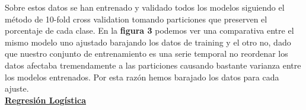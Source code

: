 \documentclass{article}
\begin{document}
Sobre estos datos se han entrenado y validado todos los modelos siguiendo el método de 10-fold cross validation tomando particiones que preserven el porcentaje de cada clase. En la \textbf{figura 3} podemos ver una comparativa entre el mismo modelo uno ajustado barajando los datos de training y el otro no, dado que nuestro conjunto de entrenamiento es una serie temporal no reordenar los datos afectaba tremendamente a las particiones causando bastante varianza entre los modelos entrenados. Por esta razón hemos barajado los datos para cada ajuste.
\\





\noindent \textbf{\underline{\Large Regresión Logística}}
\end{document}
